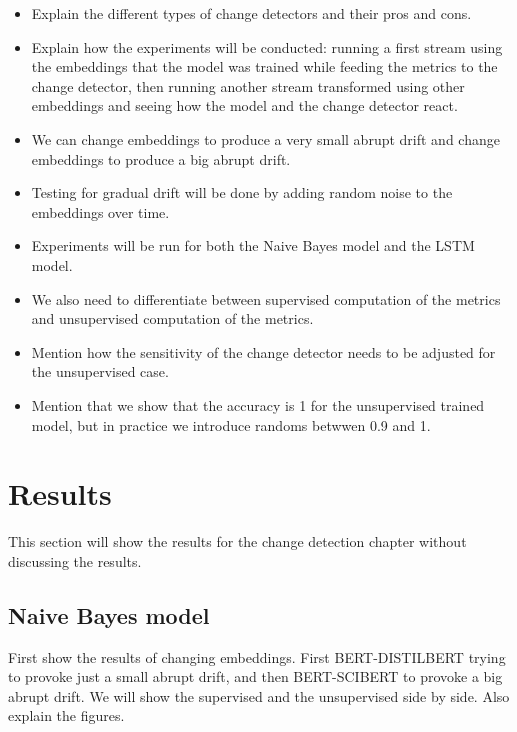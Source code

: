 \documentclass[12pt]{extreport}
\begin{document}
\begin{itemize}
    \item Explain the different types of change detectors and their pros and cons.
    \item Explain how the experiments will be conducted: running a first stream using the embeddings that the model was trained while feeding the metrics to the change detector, then running another stream transformed using other embeddings and seeing how the model and the change detector react.
    \item We can change embeddings to produce a very small abrupt drift and change embeddings to produce a big abrupt drift.
    \item Testing for gradual drift will be done by adding random noise to the embeddings over time.
    \item Experiments will be run for both the Naive Bayes model and the LSTM model.
    \item We also need to differentiate between supervised computation of the metrics and unsupervised computation of the metrics.
    \item Mention how the sensitivity of the change detector needs to be adjusted for the unsupervised case.
    \item Mention that we show that the accuracy is 1 for the unsupervised trained model, but in practice we introduce randoms betwwen 0.9 and 1.
\end{itemize}

\section{Results}

This section will show the results for the change detection chapter without discussing the results.

\subsection{Naive Bayes model}

First show the results of changing embeddings. First BERT-DISTILBERT trying to provoke just a small abrupt drift, and then BERT-SCIBERT to provoke a big abrupt drift. We will show the supervised and the unsupervised side by side. Also explain the figures.
\end{document}
